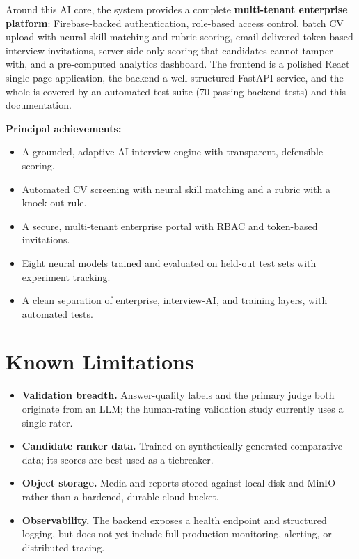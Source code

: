 \documentclass[12pt,a4paper,oneside]{report}
\begin{document}
Around this AI core, the system provides a complete \textbf{multi-tenant enterprise platform}:
Firebase-backed authentication, role-based access control, batch CV upload with neural skill
matching and rubric scoring, email-delivered token-based interview invitations,
server-side-only scoring that candidates cannot tamper with, and a pre-computed analytics
dashboard. The frontend is a polished React single-page application, the backend a
well-structured FastAPI service, and the whole is covered by an automated test suite (70
passing backend tests) and this documentation.

\textbf{Principal achievements:}

\begin{itemize}
  \item A grounded, adaptive AI interview engine with transparent, defensible scoring.
  \item Automated CV screening with neural skill matching and a rubric with a knock-out rule.
  \item A secure, multi-tenant enterprise portal with RBAC and token-based invitations.
  \item Eight neural models trained and evaluated on held-out test sets with experiment
    tracking.
  \item A clean separation of enterprise, interview-AI, and training layers, with automated
    tests.
\end{itemize}

\section{Known Limitations}

\begin{itemize}
  \item \textbf{Validation breadth.} Answer-quality labels and the primary judge both originate
    from an LLM; the human-rating validation study currently uses a single rater.
  \item \textbf{Candidate ranker data.} Trained on synthetically generated comparative data;
    its scores are best used as a tiebreaker.
  \item \textbf{Object storage.} Media and reports stored against local disk and MinIO rather
    than a hardened, durable cloud bucket.
  \item \textbf{Observability.} The backend exposes a health endpoint and structured logging,
    but does not yet include full production monitoring, alerting, or distributed tracing.
\end{itemize}
\end{document}
